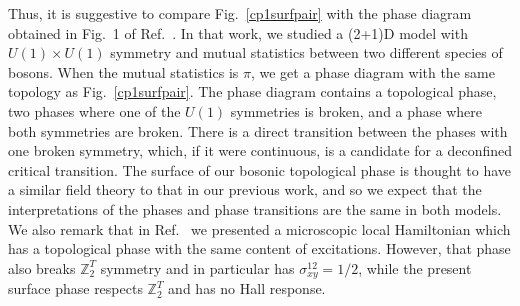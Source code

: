 \documentclass[prb,twocolumn]{revtex4-1}
\def\ztwot{\mathbb{Z}_2^T}
\begin{document}
Thus, it is suggestive to compare Fig.~\ref{cp1surfpair} with the phase diagram obtained in Fig.~1 of Ref.~. In that work, we studied a (2+1)D model with $U(1)\times U(1)$ symmetry and mutual statistics between two different species of bosons. When the mutual statistics is $\pi$, we get a phase diagram with the same topology as Fig.~\ref{cp1surfpair}. The phase diagram contains a topological phase, two phases where one of the $U(1)$ symmetries is broken, and a phase where both symmetries are broken. There is a direct transition between the phases with one broken symmetry, which, if it were continuous, is a candidate for a deconfined critical transition.\cite{Gen2Loops} The surface of our bosonic topological phase is thought to have a similar field theory to that in our previous work,\cite{Loopy,Gen2Loops} and so we expect that the interpretations of the phases and phase transitions are the same in both models. We also remark that in Ref.~ we presented a microscopic local Hamiltonian which has a topological phase with the same content of excitations. However, that phase also breaks $\ztwot$ symmetry and in particular has $\sigma_{xy}^{12}=1/2$, while the present surface phase respects $\ztwot$ and has no Hall response.
\end{document}
